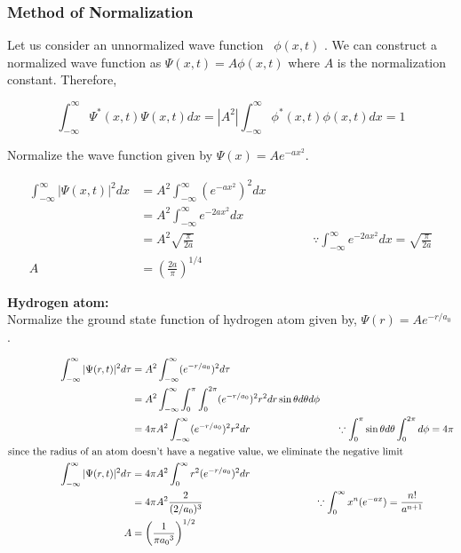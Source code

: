 \subsubsection{Method of Normalization}
Let us consider an unnormalized wave function \ $\phi(x, t)$  . We can construct a normalized wave function as
$\Psi(x, t)=A \phi(x, t)$ where $A$ is the normalization constant. Therefore,

$$
\int_{-\infty}^{\infty} \Psi^{*}(x, t) \Psi(x, t) d x=\left|A^{2}\right| \int_{-\infty}^{\infty} \phi^{*}(x, t) \phi(x, t) d x=1
$$

\begin{exercise}
	Normalize the wave function given by $\Psi(x)=A e^{-ax^{2}}$.
\end{exercise}
\begin{answer}
	\begin{align*}
	\int_{-\infty}^{\infty} |\Psi(x,t)|^{2} dx&=A^{2}\int_{-\infty}^{\infty}( e^{-ax^{2}})^{2} dx\\
	&=A^{2}\int_{-\infty}^{\infty} e^{-2ax^{2}}dx\\
	&=A^{2}\sqrt{\frac{\pi}{2a}}\hspace{4cm}\because \int_{-\infty}^{\infty} e^{-2ax^{2}}dx=\sqrt{\frac{\pi}{2a}} \\
	A&=\left(\frac{2a}{\pi} \right)^{1/4} 
	\end{align*}
\end{answer}
\begin{exercise}
	\textbf{Hydrogen atom:}\\
	Normalize the ground state function of hydrogen atom given by,  $\Psi(r)=A e^{-r/a_{0}}$.
\end{exercise}
\begin{answer}
	\begin{align*}
	\int_{-\infty}^{\infty} |\Psi(r,t)|^{2} d\tau&=A^{2}\int_{-\infty}^{\infty}( e^{-r/a_{0}})^{2} d\tau\\
	&=A^{2}\int_{-\infty}^{\infty} \int_{0}^{\pi}\int_{0}^{2\pi}( e^{-r/a_{0}})^{2} r^{2}dr\sin\theta d\theta d\phi\\
	&=4\pi A^{2}\int_{-\infty}^{\infty}( e^{-r/a_{0}})^{2} r^{2}dr \hspace{3cm}\because \int_{0}^{\pi}\sin\theta d\theta \int_{0}^{2\pi}d\phi=4\pi\\
	\text{since the radius of an atom }&\text{doesn't have a negative value, we eliminate the negative limit}\\
	\int_{-\infty}^{\infty} |\Psi(r,t)|^{2} d\tau&=4\pi A^{2} \int_{0}^{\infty}r^{2}( e^{-r/a_{0}})^{2} dr \\
	&=4\pi A^{2} \frac{2}{(2/a_{0})^{3}} \hspace{3.9cm}\because \int_{0}^{\infty} x^{n}( e^{-ax})=\frac{n!}{a^{n+1}}\\
	A&=\left(\frac{1}{\pi {a_{0}}^{3}} \right)^{1/2} 
	\end{align*}
\end{answer}
